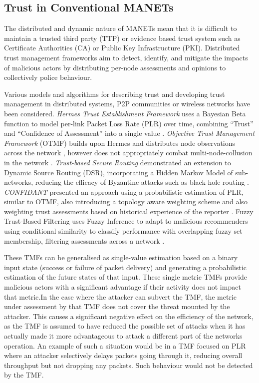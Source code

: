 \documentclass{aamas2016}
\begin{document}
\subsection{Trust in Conventional MANETs}
The distributed and dynamic nature of MANETs mean that it is difficult to maintain a trusted third party (TTP) or evidence based trust system such as Certificate Authorities (CA) or Public Key Infrastructure (PKI). 
Distributed trust management frameworks aim to detect, identify, and mitigate the impacts of malicious actors by distributing per-node assessments and opinions to collectively police behaviour. 

Various models and algorithms for describing trust and developing trust management in distributed systems, P2P communities or wireless networks have been considered.
\textit{Hermes Trust Establishment Framework} uses a Bayesian Beta function to model per-link Packet Loss Rate (PLR) over time, combining ``Trust'' and ``Confidence of Assessment'' into a single value \cite{Zouridaki2005}.
\textit{Objective Trust Management Framework} (OTMF) builds upon Hermes and distributes node observations across the network \cite{Li2008}, however does not appropriately combat multi-node-collusion in the network \cite{Cho2011}. 
\textit{Trust-based Secure Routing} demonstrated an extension to Dynamic Source Routing (DSR), incorporating a Hidden Markov Model of sub-networks, reducing the efficacy of Byzantine attacks such as black-hole routing  \cite{Moe2008a}. 
\textit{CONFIDANT} presented an approach using a probabilistic estimation of PLR, similar to OTMF, also introducing a topology aware weighting scheme and also weighting trust assessments based on historical experience of the reporter \cite{Buchegger2002}. Fuzzy Trust-Based Filtering uses Fuzzy Inference to adapt to malicious recommenders using conditional similarity to classify performance with overlapping fuzzy set membership, filtering assessments across a network \cite{Luo2008}. 

These TMFs can be generalised as single-value estimation based on a binary input state (success or failure of packet delivery) and generating a probabilistic estimation of the future states of that input. These single metric TMFs provide malicious actors with a significant advantage if their activity does not impact that metric.In the case where the attacker can subvert the TMF, the metric under assessment by that TMF does not cover the threat mounted by the attacker. This causes a significant negative effect on the efficiency of the network, as the TMF is assumed to have reduced the possible set of attacks when it has actually made it more advantageous to attack a different part of the networks operation.
An example of such a situation would be in a TMF focused on PLR where an attacker selectively delays packets going through it, reducing overall throughput but not dropping any packets. Such behaviour would not be detected by the TMF.
\end{document}
